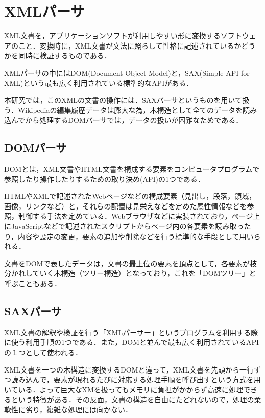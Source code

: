 \section{XMLパーサ}

XML文書を，アプリケーションソフトが利用しやすい形に変換するソフトウェアのこと．変換時に，XML文書が文法に照らして性格に記述されているかどうかを同時に検証するものである．

XMLパーサの中にはDOM(Document Object Model)と，SAX(Simple API for XML)という最も広く利用されている標準的なAPIがある．

本研究では，このXMLの文書の操作には．SAXパーサというものを用いて扱う．Wikipediaの編集履歴データは膨大な為，木構造として全てのデータを読み込んでから処理するDOMパーサでは，データの扱いが困難なためである．



\subsection{DOMパーサ}

DOMとは，XML文書やHTML文書を構成する要素をコンピュータプログラムで参照したり操作したりするための取り決め(API)の1つである．

HTMLやXMLで記述されたWebページなどの構成要素（見出し，段落，領域，画像，リンクなど）と，それらの配置は見栄えなどを定めた属性情報などを参照，制御する手法を定めている．Webブラウザなどに実装されており，ページ上にJavaScriptなどで記述されたスクリプトからページ内の各要素を読み取ったり，内容や設定の変更，要素の追加や削除などを行う標準的な手段として用いられる．

文書をDOMで表したデータは，文書の最上位の要素を頂点として，各要素が枝分かれしていく木構造（ツリー構造）となっており，これを「DOMツリー」と呼ぶこともある．\cite{DOM1}



\subsection{SAXパーサ}

XML文書の解釈や検証を行う「XMLパーサー」というプログラムを利用する際に使う利用手順の1つである．また，DOMと並んで最も広く利用されているAPIの１つとして使われる．

XML文書を一つの木構造に変換するDOMと違って，XML文書を先頭から一行ずつ読み込んで，要素が現れるたびに対応する処理手順を呼び出すという方式を用いている．よって巨大なXMを扱ってもメモリに負担がかからず高速に処理できるという特徴がある．その反面，文書の構造を自由にたどれないので，処理の柔軟性に劣り，複雑な処理には向かない．\cite{SAX1}



